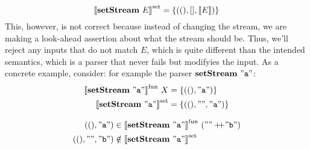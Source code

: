 \documentclass{article}
\begin{document}
\[
{\llbracket{\mathbf{setStream}~{E}}\rrbracket}^{\mathrm{set}} = \{{ ((),[], \llbracket{E}\rrbracket) }\}
\]
This, however, is not correct because instead of changing the stream,
we are making a look-ahead assertion about what the stream should be.
Thus, we'll reject any inputs that do not match $E$, which is quite
different than the intended semantics, which is a parser that never fails
but modifyies the input. As a concrete example, consider:
for example the parser $\mathbf{setStream}~{\mathtt{"{a}"}}$:
\begin{align*}
{\llbracket{\mathbf{setStream}~{\mathtt{"{a}"}}}\rrbracket}^{\mathrm{fun}}~X &= \{{ ((),\mathtt{"{a}"}) }\} \\
{\llbracket{\mathbf{setStream}~{\mathtt{"{a}"}}}\rrbracket}^{\mathrm{set}}   &= \{{ ((),\mathtt{"{}"},\mathtt{"{a}"}) }\}
\end{align*}

\begin{align*}
((),\mathtt{"{a}"}) & \in {\llbracket{\mathbf{setStream}~{\mathtt{"{a}"}}}\rrbracket}^{\mathrm{fun}}~
                                      (\mathtt{"{}"} +\!\!\!+ \mathtt{"{b}"}) \\
((),\mathtt{"{}"},\mathtt{"{b}"}) & \notin {\llbracket{\mathbf{setStream}~{\mathtt{"{a}"}}}\rrbracket}^{\mathrm{set}}
\end{align*}
\end{document}
